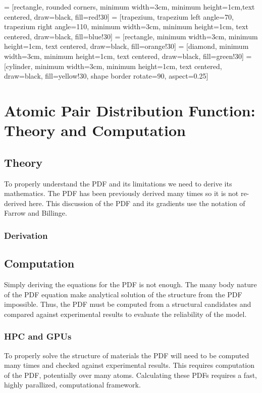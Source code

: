 \graphicspath{{./pdf/figures/}}
 = [rectangle, rounded corners, minimum width=3cm, minimum height=1cm,text centered, draw=black, fill=red!30]
 = [trapezium, trapezium left angle=70, trapezium right angle=110, minimum width=3cm, minimum height=1cm, text centered, draw=black, fill=blue!30]
 = [rectangle, minimum width=3cm, minimum height=1cm, text centered, draw=black, fill=orange!30]
 = [diamond, minimum width=3cm, minimum height=1cm, text centered, draw=black, fill=green!30]
\usetikzlibrary{shapes.geometric}
 = [cylinder, minimum width=3cm, minimum height=1cm, text centered, draw=black, fill=yellow!30, shape border rotate=90, aspect=0.25]

\chapter{Atomic Pair Distribution Function: \\Theory and Computation} \label{ch:pdf}
\section{Theory}
To properly understand the PDF and its limitations we need to derive its mathematics.
The PDF has been previously derived many times so it is not re-derived here.
This discussion of the PDF and its gradients use the notation of Farrow and Billinge. \cite{Farrow2009}
\subsection{Derivation}


\section{Computation} \label{sec:comp}
Simply deriving the equations for the PDF is not enough.
The many body nature of the PDF equation make analytical solution of the structure from the PDF impossible.
Thus, the PDF must be computed from a structural candidates and compared against experimental results to evaluate the reliability of the model.

\subsection{HPC and GPUs}
To properly solve the structure of materials the PDF will need to be computed many times and checked against experimental results.
This requires computation of the PDF, potentially over many atoms.
Calculating these PDFs requires a fast, highly parallized, computational framework.
